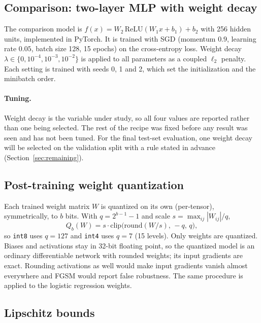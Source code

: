 \documentclass{article}
\newcommand{\ieight}{\texttt{int8}}
\newcommand{\ifour}{\texttt{int4}}
\begin{document}
\subsection{Comparison: two-layer MLP with weight decay}

The comparison model is $f(x) = W_2\,\mathrm{ReLU}(W_1 x + b_1) + b_2$ with 256 hidden units, implemented in PyTorch. It is trained with SGD (momentum $0.9$, learning rate $0.05$, batch size 128, 15 epochs) on the cross-entropy loss. Weight decay $\lambda \in \{0, 10^{-4}, 10^{-3}, 10^{-2}\}$ is applied to all parameters as a coupled $\ell_2$ penalty. Each setting is trained with seeds 0, 1 and 2, which set the initialization and the minibatch order.

\paragraph{Tuning.} Weight decay is the variable under study, so all four values are reported rather than one being selected. The rest of the recipe was fixed before any result was seen and has not been tuned. For the final test-set evaluation, one weight decay will be selected on the validation split with a rule stated in advance (Section~\ref{sec:remaining}).

\subsection{Post-training weight quantization}

Each trained weight matrix $W$ is quantized on its own (per-tensor), symmetrically, to $b$ bits. With $q = 2^{b-1} - 1$ and scale $s = \max_{ij} |W_{ij}| / q$,
\begin{equation}
  Q_b(W) = s \cdot \mathrm{clip}\bigl(\mathrm{round}(W / s),\, -q,\, q\bigr),
\end{equation}
so \ieight{} uses $q = 127$ and \ifour{} uses $q = 7$ (15 levels). Only weights are quantized. Biases and activations stay in 32-bit floating point, so the quantized model is an ordinary differentiable network with rounded weights; its input gradients are exact. Rounding activations as well would make input gradients vanish almost everywhere and FGSM would report false robustness. The same procedure is applied to the logistic regression weights.

\subsection{Lipschitz bounds}
\end{document}
